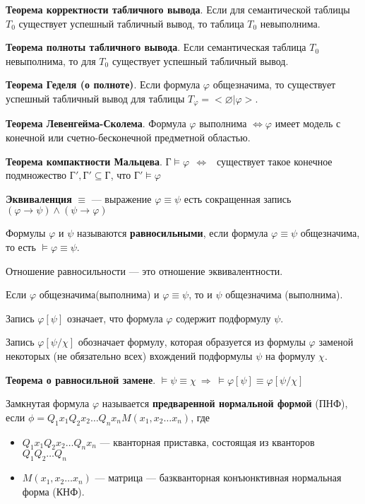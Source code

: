 \documentclass[a4paper,12pt]{article}
\begin{document}
\textbf{Теорема корректности табличного вывода}. Если для семантической таблицы $T_0$ существует успешный табличный вывод, то таблица $T_0$ невыполнима.


\textbf{Теорема полноты табличного вывода}. Если семантическая таблица $T_0$ невыполнима, то для $T_0$ существует успешный табличный вывод.

\textbf{Теорема Геделя (о полноте)}. Если формула $\varphi$ общезначима, то существует успешный табличный вывод для таблицы $T_\varphi = <\varnothing|\varphi>$.

\textbf{Теорема Левенгейма-Сколема}. Формула $\varphi$ выполнима $\Leftrightarrow \varphi$ имеет модель с конечной или счетно-бесконечной предметной областью.

\textbf{Теорема компактности Мальцева}. $\text{Г} \models \varphi ~~ \Leftrightarrow ~~ $ существует такое конечное подмножество $\text{Г}', \text{Г}' \subseteq \text{Г}$, что $\text{Г}' \models \varphi$



\textbf{Эквиваленция} $\equiv$ --- выражение $\varphi \equiv \psi$ есть сокращенная запись $(\varphi \rightarrow \psi) \wedge (\psi \rightarrow \varphi)$

Формулы $\varphi$ и $\psi$ называются \textbf{равносильными}, если формула $\varphi \equiv \psi$ общезначима, то есть $\models \varphi \equiv \psi$.

Отношение равносильности --- это отношение эквивалентности.

Если $\varphi$ общезначима(выполнима) и $\varphi \equiv \psi$, то и $\psi$ общезначима (выполнима).

Запись $\varphi[\psi]$ означает, что формула $\varphi$ содержит подформулу $\psi$.

Запись $\varphi[\psi/\chi]$ обозначает формулу, которая образуется из формулы $\varphi$ заменой некоторых (не обязательно всех) вхождений подформулы $\psi$ на формулу $\chi$.

\textbf{Теорема о равносильной замене}. $\models \psi \equiv \chi ~ \Rightarrow ~ \models \varphi[\psi] \equiv \varphi[\psi / \chi]$

Замкнутая формула $\varphi$ называется \textbf{предваренной нормальной формой} (ПНФ), если $\phi = Q_1 x_1 Q_2 x_2 \dots Q_n x_n M(x_1, x_2 \dots x_n)$, где
\begin{itemize}
 \item $Q_1 x_1 Q_2 x_2 \dots Q_n x_n$ --- кванторная приставка, состоящая из кванторов $Q_1 Q_2 \dots Q_n$
 \item $M(x_1, x_2 \dots x_n)$ --- матрица --- базкванторная конъюнктивная нормальная форма (КНФ).
\end{itemize}
\end{document}
